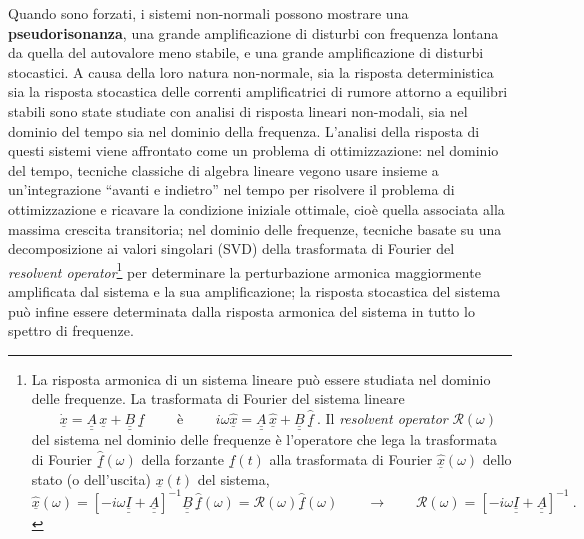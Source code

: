 Quando sono forzati, i sistemi non-normali possono mostrare una \textbf{pseudorisonanza}, una grande amplificazione di disturbi con frequenza lontana da quella del autovalore meno stabile, e una grande amplificazione di disturbi stocastici. A causa della loro natura non-normale, sia la risposta deterministica sia la risposta stocastica delle correnti amplificatrici di rumore attorno a equilibri stabili sono state studiate con analisi di risposta lineari non-modali, sia nel dominio del tempo sia nel dominio della frequenza. L'analisi della risposta di questi sistemi viene affrontato come un problema di ottimizzazione: nel dominio del tempo, tecniche classiche di algebra lineare vegono usare insieme a un'integrazione ``avanti e indietro'' nel tempo per risolvere il problema di ottimizzazione e ricavare la condizione iniziale ottimale, cioè quella associata alla massima crescita transitoria; nel dominio delle frequenze, tecniche basate su una decomposizione ai valori singolari (SVD) della trasformata di Fourier del \textit{resolvent operator}\footnote{
La risposta armonica di un sistema lineare può essere studiata nel dominio delle frequenze. La trasformata di Fourier del sistema lineare %
$\qquad \underline{\dot{x}} = \underline{\underline{A}} \, \underline{x} +
                      \underline{\underline{B}} \, \underline{f} \qquad $
è %
$\qquad i\omega\underline{\hat{x}} = \underline{\underline{A}} \, \underline{\hat{x}} +
                      \underline{\underline{B}} \, \underline{\hat{f}} \ $.
Il \textit{resolvent operator} $\mathcal{R}(\omega)$ del sistema nel dominio delle frequenze è l'operatore che lega la trasformata di Fourier $\underline{\hat{f}}(\omega)$ della forzante $\underline{f}(t)$ alla trasformata di Fourier $\underline{\hat{x}}(\omega)$ dello stato (o dell'uscita) $\underline{x}(t)$ del sistema,
\begin{equation}
    \underline{\hat{x}}(\omega) 
    = [-i\omega \underline{\underline{I}} + \underline{\underline{A}}]^{-1}
    \underline{\underline{B}} \, \underline{\hat{f}}(\omega) = \mathcal{R}(\omega) \underline{\hat{f}}(\omega) \qquad \rightarrow \qquad 
    \mathcal{R}(\omega) =[-i\omega \underline{\underline{I}} + \underline{\underline{A}}]^{-1} \ .
\end{equation}
}
per determinare la perturbazione armonica maggiormente amplificata dal sistema e la sua amplificazione; la risposta stocastica del sistema può infine essere determinata dalla risposta armonica del sistema in tutto lo spettro di frequenze.


